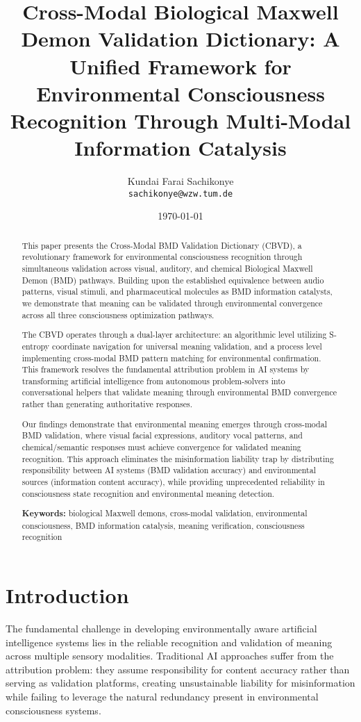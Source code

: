 \documentclass[12pt,a4paper]{article}
\title{Cross-Modal Biological Maxwell Demon Validation Dictionary: A Unified Framework for Environmental Consciousness Recognition Through Multi-Modal Information Catalysis}
\author{Kundai Farai Sachikonye\\
\texttt{sachikonye@wzw.tum.de}}
\date{\today}
\begin{document}
\maketitle

\begin{abstract}
This paper presents the Cross-Modal BMD Validation Dictionary (CBVD), a revolutionary framework for environmental consciousness recognition through simultaneous validation across visual, auditory, and chemical Biological Maxwell Demon (BMD) pathways. Building upon the established equivalence between audio patterns, visual stimuli, and pharmaceutical molecules as BMD information catalysts, we demonstrate that meaning can be validated through environmental convergence across all three consciousness optimization pathways.

The CBVD operates through a dual-layer architecture: an algorithmic level utilizing S-entropy coordinate navigation for universal meaning validation, and a process level implementing cross-modal BMD pattern matching for environmental confirmation. This framework resolves the fundamental attribution problem in AI systems by transforming artificial intelligence from autonomous problem-solvers into conversational helpers that validate meaning through environmental BMD convergence rather than generating authoritative responses.

Our findings demonstrate that environmental meaning emerges through cross-modal BMD validation, where visual facial expressions, auditory vocal patterns, and chemical/semantic responses must achieve convergence for validated meaning recognition. This approach eliminates the misinformation liability trap by distributing responsibility between AI systems (BMD validation accuracy) and environmental sources (information content accuracy), while providing unprecedented reliability in consciousness state recognition and environmental meaning detection.

\textbf{Keywords:} biological Maxwell demons, cross-modal validation, environmental consciousness, BMD information catalysis, meaning verification, consciousness recognition
\end{abstract}

\section{Introduction}

The fundamental challenge in developing environmentally aware artificial intelligence systems lies in the reliable recognition and validation of meaning across multiple sensory modalities. Traditional AI approaches suffer from the attribution problem: they assume responsibility for content accuracy rather than serving as validation platforms, creating unsustainable liability for misinformation while failing to leverage the natural redundancy present in environmental consciousness systems.
\end{document}
